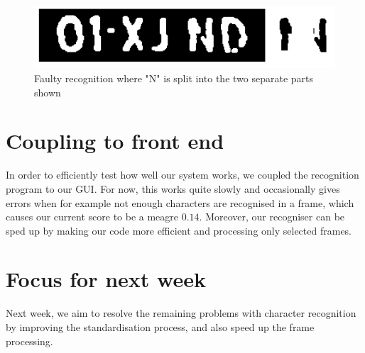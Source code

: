 \documentclass{tudelftposter}
\begin{document}
\begin{figure}[h]
	\centering
	\includegraphics[width=800pt]{brokenNplate.png}
	\caption{Faulty recognition where "N" is split into the two separate parts shown}
	\label{brokenN}
\end{figure}

\section{Coupling to front end}
In order to efficiently test how well our system works, we coupled the recognition program to our GUI. For now, this works quite slowly and occasionally gives errors when for example not enough characters are recognised in a frame, which causes our current score to be a meagre $0.14$. Moreover, our recogniser can be sped up by making our code more efficient and processing only selected frames.

\section{Focus for next week}
Next week, we aim to resolve the remaining problems with character recognition by improving the standardisation process, and also speed up the frame processing. 
\end{document}
